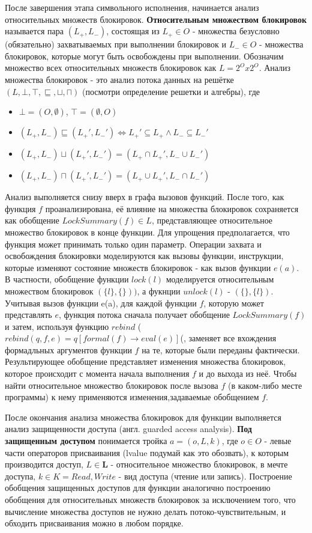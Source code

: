 После завершения этапа символьного исполнения, начинается анализ относительных множеств блокировок. \textbf{Относительным множеством блокировок} называется пара $(L_{+}, L_{-})$, состоящая из $L_{+} \in O$ - множества безусловно (обязательно) захватываемых при выполнении блокировок и $L_{-} \in O$ - множества блокировок, которые могут быть освобождены при выполнении. Обозначим множество всех относительных множеств блокировок как $L = 2^{O} x 2^{O}$. Анализ множества блокировок - это анализ потока данных на решётке $(L, \bot, \top, \sqsubseteq, \sqcup, \sqcap)$ (посмотри определение решетки  и алгебры), где
\begin{itemize}
\item $\bot = (O, \emptyset)$, $\top = (\emptyset, O)$
\item $(L_{+}, L_{-}) \sqsubseteq (L_{+}', L_{-}') \Longleftrightarrow L_{+}' \subseteq L_{+} \wedge L_{-} \subseteq L_{-}'$
\item $(L_{+}, L_{-}) \sqcup (L_{+}', L_{-}') = (L_{+} \cap L_{+}', L_{-} \cup L_{-}')$
\item $(L_{+}, L_{-}) \sqcap (L_{+}', L_{-}') = (L_{+} \cup L_{+}', L_{-} \cap L_{-}')$
\end{itemize}

Анализ выполняется снизу вверх в графа вызовов функций. После того, как функция $f$ проанализирована, её влияние на множества блокировок сохраняется как обобщение $LockSummary(f) \in L$, представляющее относительное множество блокировок в конце функции. Для упрощения предполагается, что функция может принимать только один параметр. Операции захвата и освобождения блокировки моделируются как вызовы функции, инструкции, которые изменяют состояние множеств блокировок - как вызов функции $e(a)$. В частности, обобщение функции $lock(l)$ моделируется относительным множеством блокировок $(\{l\}, \{\}))$, а фукнции $unlock(l)$ - $(\{\}, \{l\})$. Учитывая вызов функции e(a), для каждой функции $f$, которую может представлять $e$, функция потока сначала получает обобщение $LockSummary(f)$и затем, используя функцию $rebind$ ($rebind(q, f, e) = q[formal(f ) → eval(e)]$(, заменяет все вхождения формадльных аргументов функции $f$ на те, которые были переданы фактически. Результирующее обобщение представляет изменения множества блокировок, которое происходит с момента начала выполнения $f$ и до выхода из неё. Чтобы найти относительное множество блокировок после вызова $f$ (в каком-либо месте программы) к нему применяются изменения,задаваемые обобщением $f$.

После окончания анализа множества блокировок для функции выполняется анализ защищенности доступа (англ. guarded access analysis). \textbf{Под защищенным доступом} понимается тройка $a = (o, L, k)$, где $o \in O$ - левые части операторов присваивания (lvalue подумай как это обозвать), к которым производится доступ, $L \in \mathbf{L}$ - относительное множество блокировок, в мечте доступа, $k \in K = {Read, Write}$ - вид доступа (чтение или запись). Построение обобщения защищенных доступов для функции аналогично построению обобщения для относительных множеств блокировок за исключением того, что вычисление множества доступов не нужно делать потоко-чувствительным, и обходить присваивания можно в любом порядке.
